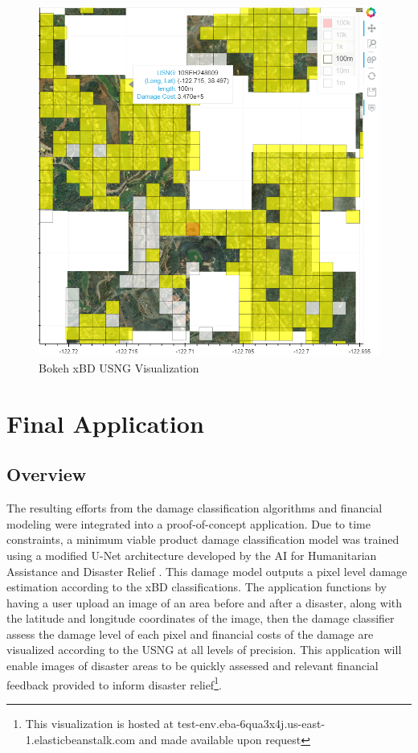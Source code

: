 \documentclass[conference]{IEEEtran}
\begin{document}
\begin{figure}[htbp]
\centering\includegraphics[width=1\linewidth]{Bokeh.png}
\caption{Bokeh xBD USNG Visualization}
\label{bokehplot}
\end{figure}




\section{Final Application}
\subsection{Overview}
The resulting efforts from the damage classification algorithms and financial modeling were integrated into a proof-of-concept application. Due to time constraints, a minimum viable product damage classification model was trained using a modified U-Net architecture developed by the AI for Humanitarian Assistance and Disaster Relief \cite{a17}. This damage model outputs a pixel level damage estimation according to the xBD classifications. The application functions by having a user upload an image of an area before and after a disaster, along with the latitude and longitude coordinates of the image, then the damage classifier assess the damage level of each pixel and financial costs of the damage are visualized according to the USNG at all levels of precision. This application will enable images of disaster areas to be quickly assessed and relevant financial feedback provided to inform disaster relief\footnote{ This visualization is hosted at test-env.eba-6qua3x4j.us-east-1.elasticbeanstalk.com and made available upon request}.
\end{document}
